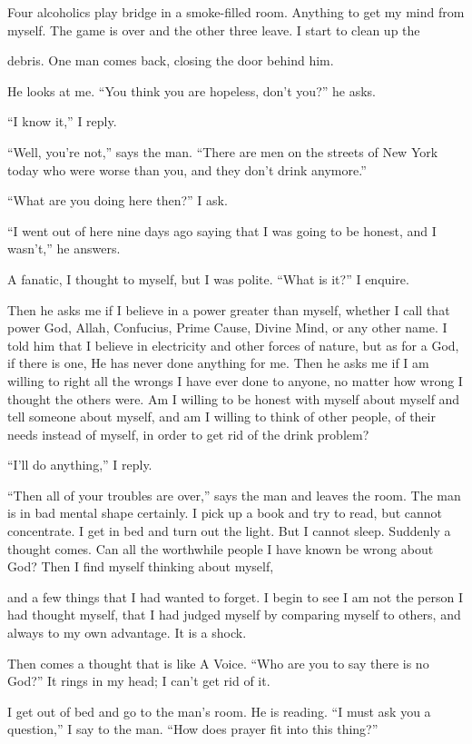 \begin{biblechapter}
Four alcoholics play bridge in a smoke-filled room. Anything to get my mind from myself. The game is over and the other three leave. I start to clean up the

debris. One man comes back, closing the door behind him.

He looks at me. “You think you are hopeless, don’t you?” he asks.

“I know it,” I reply.

“Well, you’re not,” says the man. “There are men on the streets of New York today who were worse than you, and they don’t drink anymore.”

“What are you doing here then?” I ask.

“I went out of here nine days ago saying that I was going to be honest, and I wasn’t,” he answers.

A fanatic, I thought to myself, but I was polite. “What is it?” I enquire.

Then he asks me if I believe in a power greater than myself, whether I call that power God, Allah, Confucius, Prime Cause, Divine Mind, or any other name. I told him that I believe in electricity and other forces of nature, but as for a God, if there is one, He has never done anything for me. Then he asks me if I am willing to right all the wrongs I have ever done to anyone, no matter how wrong I thought the others were. Am I willing to be honest with myself about myself and tell someone about myself, and am I willing to think of other people, of their needs instead of myself, in order to get rid of the drink problem?

“I’ll do anything,” I reply.

“Then all of your troubles are over,” says the man and leaves the room. The man is in bad mental shape certainly. I pick up a book and try to read, but cannot concentrate. I get in bed and turn out the light. But I cannot sleep. Suddenly a thought comes. Can all the worthwhile people I have known be wrong about God? Then I find myself thinking about myself,

and a few things that I had wanted to forget. I begin to see I am not the person I had thought myself, that I had judged myself by comparing myself to others, and always to my own advantage. It is a shock.

Then comes a thought that is like A Voice. “Who are you to say there is no God?” It rings in my head; I can’t get rid of it.

I get out of bed and go to the man’s room. He is reading. “I must ask you a question,” I say to the man. “How does prayer fit into this thing?”


\end{biblechapter}
